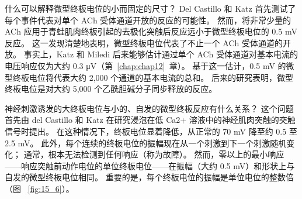 什么可以解释微型终板电位的小而固定的尺寸？
Del Castillo 和 Katz 首先测试了每个事件代表对单个 ACh 受体通道开放的反应的可能性。
然而，将非常少量的 ACh 应用于青蛙肌肉终板引起的去极化突触后反应远小于微型终板电位的 0.5 mV 反应。 
这一发现清楚地表明，微型终板电位代表了不止一个 ACh 受体通道的开放。
事实上，Katz 和 Miledi 后来能够估计通过单个 ACh 受体通道对基本电流的电压响应仅为大约 0.3 μV（第~\ref{chap:chap12}~章）。
基于这一估计，0.5 mV 的微型终板电位将代表大约 2,000 个通道的基本电流的总和。
后来的研究表明，微型终板电位是对大约 5,000 个乙酰胆碱分子同步释放的反应。


神经刺激诱发的大终板电位与小的、自发的微型终板反应有什么关系？
这个问题首先由 del Castillo 和 Katz 在研究浸泡在低 Ca2+ 溶液中的神经肌肉突触的突触信号时提出。
在这种情况下，终板电位显着降低，从正常的 70 mV 降至约 0.5 至 2.5 mV。
此外，每个连续的终板电位的振幅现在从一个刺激到下一个刺激随机变化；
通常，根本无法检测到任何响应（称为故障）。
然而，零以上的最小响应——响应突触前动作电位的单位终板电位——在振幅（大约 0.5 mV）和形状上与自发的微型终板电位相同。
重要的是，每个终板电位的振幅是单位电位的整数倍（图 ~\ref{fig:15_6}）。



